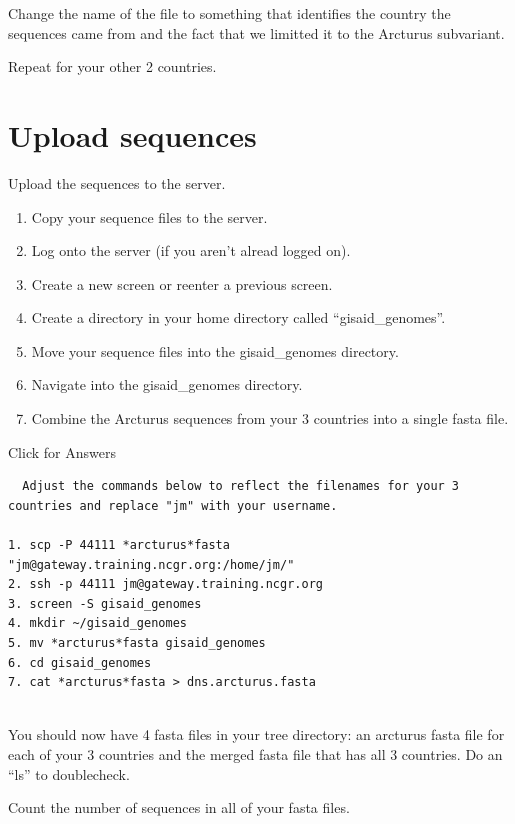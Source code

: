 \documentclass[
]{book}
\providecommand{\tightlist}{%
  \setlength{\itemsep}{0pt}\setlength{\parskip}{0pt}}
\begin{document}
Change the name of the file to something that identifies the country the sequences came from and the fact that we limitted it to the Arcturus subvariant.

Repeat for your other 2 countries.

\hypertarget{upload-sequences}{%
\section{Upload sequences}\label{upload-sequences}}

Upload the sequences to the server.

\begin{enumerate}
\def\labelenumi{\arabic{enumi}.}
\tightlist
\item
  Copy your sequence files to the server.
\item
  Log onto the server (if you aren't alread logged on).
\item
  Create a new screen or reenter a previous screen.
\item
  Create a directory in your home directory called ``gisaid\_genomes''.
\item
  Move your sequence files into the gisaid\_genomes directory.
\item
  Navigate into the gisaid\_genomes directory.
\item
  Combine the Arcturus sequences from your 3 countries into a single fasta file.
\end{enumerate}

Click for Answers

\begin{verbatim}
  Adjust the commands below to reflect the filenames for your 3 countries and replace "jm" with your username.
  
1. scp -P 44111 *arcturus*fasta "jm@gateway.training.ncgr.org:/home/jm/"
2. ssh -p 44111 jm@gateway.training.ncgr.org
3. screen -S gisaid_genomes
4. mkdir ~/gisaid_genomes
5. mv *arcturus*fasta gisaid_genomes
6. cd gisaid_genomes
7. cat *arcturus*fasta > dns.arcturus.fasta
  
\end{verbatim}

\hfill\break

You should now have 4 fasta files in your tree directory: an arcturus fasta file for each of your 3 countries and the merged fasta file that has all 3 countries. Do an ``ls'' to doublecheck.

Count the number of sequences in all of your fasta files.
\end{document}
